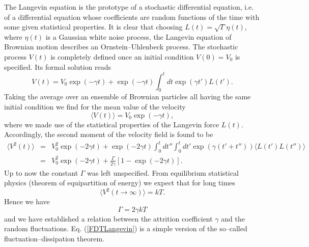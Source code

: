 The Langevin equation is the prototype of a stochastic 
differential equation, i.e. of a differential equation whose
coefficients are random functions of the time with some given
statistical properties. 
It is clear that choosing $L(t)=\sqrt{\Gamma} \eta(t)$,
where $\eta(t)$ is a Gaussian white noise process, the Langevin 
equation of Brownian motion describes an Ornstein--Uhlenbeck
process.
The stochastic process $V(t)$ is 
completely defined once an initial condition $V(0)=V_0$ is specified.
Its formal solution reads
\begin{equation*}
V(t) = V_0 \exp(-\gamma t) + \exp(-\gamma t) 
    \int_0^t dt \exp(\gamma t') L(t').
\end{equation*}
Taking the average over an ensemble of Brownian particles all
having the same initial condition we find for the mean value of 
the velocity
\begin{equation*}
\langle V(t) \rangle = V_0 \exp(-\gamma t),
\end{equation*}
where we made use of the statistical properties of the Langevin 
force $L(t)$. Accordingly, the second moment of the velocity field
is found to be
\begin{eqnarray*}
\langle V^2(t) \rangle &=& V_0^2 \exp(-2\gamma t)
          + \exp(-2 \gamma t) \int_0^t dt'' \int_0^t dt'
             \exp(\gamma (t' + t'')) \langle L(t') L(t'') \rangle 
             \\
          &=& V_0^2 \exp(-2\gamma t) + \frac{\Gamma}{2 \gamma}
             [1-\exp(-2 \gamma t)].
\end{eqnarray*}
Up to now the constant $\Gamma$ was left unspecified. From 
equilibrium statistical physics (theorem of equipartition of energy) 
we  expect that for long times 
\begin{equation*}
\langle V^2(t\rightarrow \infty) \rangle = kT.
\end{equation*}
Hence we have
\begin{equation}
\label{FDTLangevin}
\Gamma = 2 \gamma kT
\end{equation}
and we have established a relation between the attrition 
coefficient $\gamma$ and the random fluctuations.
Eq. (\ref{FDTLangevin}) is a simple version of the so--called
fluctuation--dissipation theorem.


